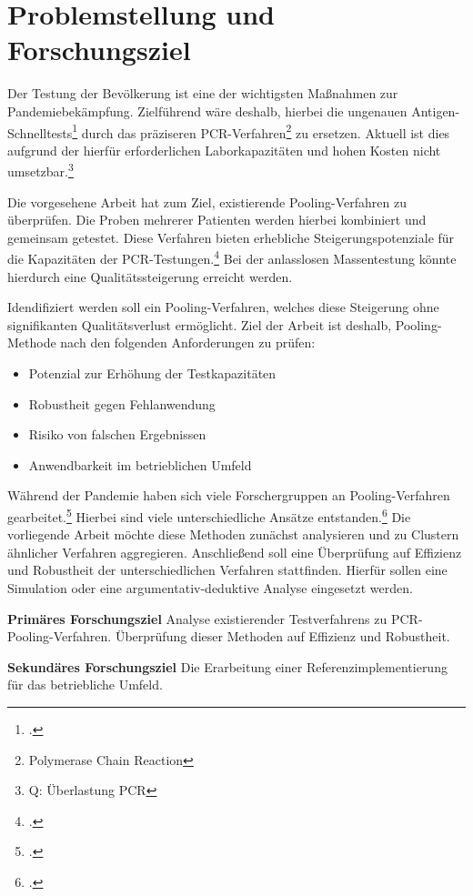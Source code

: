 
\chapter{Problemstellung und Forschungsziel}
Der Testung der Bevölkerung ist eine der wichtigsten Maßnahmen zur Pandemiebekämpfung.
Zielführend wäre deshalb, hierbei die ungenauen Antigen-Schnelltests\footcite{WuerzburgStudie}
durch das präziseren PCR-Verfahren\footnote{Polymerase Chain Reaction}
zu ersetzen.
Aktuell ist dies aufgrund der hierfür erforderlichen Laborkapazitäten und hohen Kosten nicht umsetzbar.\footnote{Q: Überlastung PCR}

Die vorgesehene Arbeit hat zum Ziel, existierende Pooling-Verfahren zu überprüfen.
Die Proben mehrerer Patienten werden hierbei kombiniert und gemeinsam getestet.
Diese Verfahren bieten erhebliche Steigerungspotenziale für die Kapazitäten der PCR-Testungen.\footcite{Aertzeblatt}
Bei der anlasslosen Massentestung könnte hierdurch eine Qualitätssteigerung erreicht werden.

Idendifiziert werden soll ein Pooling-Verfahren, welches diese Steigerung ohne signifikanten Qualitätsverlust ermöglicht.
Ziel der Arbeit ist deshalb, Pooling-Methode nach den folgenden Anforderungen zu prüfen:
\begin{itemize}
\setlength{\itemsep}{-8pt}
\item Potenzial zur Erhöhung der Testkapazitäten
\item Robustheit gegen Fehlanwendung
\item Risiko von falschen Ergebnissen
\item Anwendbarkeit im betrieblichen Umfeld
\end{itemize}

Während der Pandemie haben sich viele Forschergruppen an Pooling-Verfahren gearbeitet.\footcite{Aertzeblatt}
Hierbei sind viele unterschiedliche Ansätze entstanden.\footcite{Preprint-Pooling}
Die vorliegende Arbeit möchte diese Methoden zunächst analysieren und zu Clustern ähnlicher Verfahren aggregieren.
Anschließend soll  eine Überprüfung auf Effizienz und Robustheit der unterschiedlichen Verfahren stattfinden.
Hierfür sollen eine Simulation oder eine argumentativ-deduktive Analyse eingesetzt werden.

\textbf{Primäres Forschungsziel}\newline
 Analyse existierender Testverfahrens zu PCR-Pooling-Verfahren.\newline
 Überprüfung dieser Methoden auf Effizienz und Robustheit.
 
 \textbf{Sekundäres Forschungsziel}\newline 
 Die Erarbeitung einer Referenzimplementierung für das betriebliche Umfeld.\newline